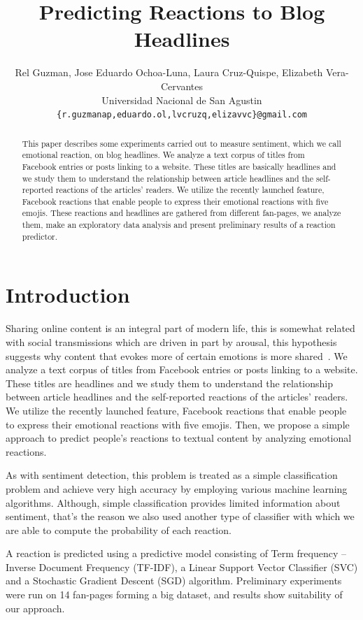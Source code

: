 \documentclass[9pt]{article}
\title{Predicting Reactions to Blog Headlines}
\author{Rel Guzman, Jose Eduardo Ochoa-Luna, Laura Cruz-Quispe, Elizabeth Vera-Cervantes \\
Universidad Nacional de San Agustin \\
  {\tt \{r.guzmanap,eduardo.ol,lvcruzq,elizavvc\}@gmail.com} \\}
\date{}
\begin{document}
\maketitle
\begin{abstract}

This paper describes some experiments carried out to measure sentiment, which we call emotional reaction, on blog headlines. We analyze a text corpus of titles from Facebook entries or posts linking to a website. These titles are basically headlines and we study them to understand the relationship between article headlines and the self-reported reactions of the articles' readers. We utilize the recently launched feature, Facebook reactions that enable people to express their emotional reactions with five emojis. These reactions and headlines are gathered from different fan-pages, we analyze them, make an exploratory data analysis and present preliminary results of a reaction predictor.

\end{abstract}


\section{Introduction}

Sharing online content is an integral part of modern life, this is somewhat related with social transmissions which are driven in part by arousal, this hypothesis suggests why content that evokes more of certain emotions is more shared~\cite{berger2011arousal}. We analyze a text corpus of titles from Facebook entries or posts linking to a website. These titles are headlines and we study them to understand the relationship between article headlines and the self-reported reactions of the articles' readers. We utilize the recently launched feature, Facebook reactions that enable people to express their emotional reactions with five emojis. Then, we propose a simple approach to predict people's reactions to textual content by analyzing emotional reactions. 

As with sentiment detection, this problem is treated as a simple classification problem and achieve very high accuracy by employing various machine learning algorithms. Although, simple classification provides limited information about sentiment, that's the reason we also used another type of classifier with which we are able to compute the probability of each reaction.

A reaction is predicted using a predictive model consisting of Term frequency – Inverse Document Frequency (TF-IDF), a Linear Support Vector Classifier (SVC) and a Stochastic Gradient Descent (SGD) algorithm. Preliminary experiments were run on 14 fan-pages forming a big dataset, and results show suitability of our approach. 
\end{document}
